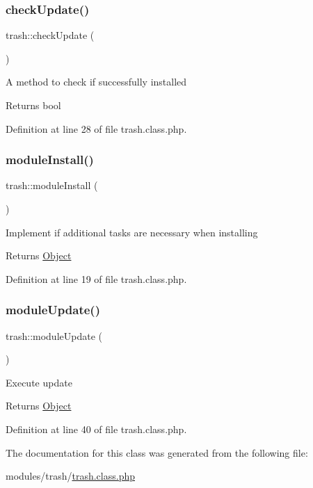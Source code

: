 \subsubsection{\texorpdfstring{check\+Update()}{checkUpdate()}}
{\footnotesize\ttfamily trash\+::check\+Update (\begin{DoxyParamCaption}{ }\end{DoxyParamCaption})}

A method to check if successfully installed \begin{DoxyReturn}{Returns}
bool 
\end{DoxyReturn}


Definition at line 28 of file trash.\+class.\+php.

\hypertarget{classtrash_aab8bc21b844b643ba68aa2c0ef6fcc10}{}\label{classtrash_aab8bc21b844b643ba68aa2c0ef6fcc10} 
\subsubsection{\texorpdfstring{module\+Install()}{moduleInstall()}}
{\footnotesize\ttfamily trash\+::module\+Install (\begin{DoxyParamCaption}{ }\end{DoxyParamCaption})}

Implement if additional tasks are necessary when installing \begin{DoxyReturn}{Returns}
\hyperlink{classObject}{Object} 
\end{DoxyReturn}


Definition at line 19 of file trash.\+class.\+php.

\hypertarget{classtrash_a895b71f0ed15178c9aa04f2d0738aa31}{}\label{classtrash_a895b71f0ed15178c9aa04f2d0738aa31} 
\subsubsection{\texorpdfstring{module\+Update()}{moduleUpdate()}}
{\footnotesize\ttfamily trash\+::module\+Update (\begin{DoxyParamCaption}{ }\end{DoxyParamCaption})}

Execute update \begin{DoxyReturn}{Returns}
\hyperlink{classObject}{Object} 
\end{DoxyReturn}


Definition at line 40 of file trash.\+class.\+php.



The documentation for this class was generated from the following file\+:\begin{DoxyCompactItemize}
\item 
modules/trash/\hyperlink{trash_8class_8php}{trash.\+class.\+php}\end{DoxyCompactItemize}
